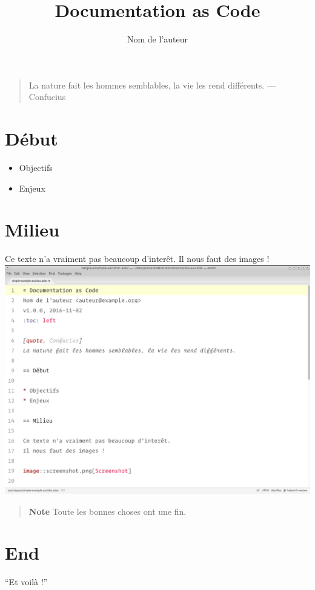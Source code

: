 \documentclass{article}
\begin{document}
\title{Documentation as Code}
\author{Nom de l'auteur}
\maketitle
\tableofcontents
\begin{quote}
	La nature fait les hommes semblables, la vie les rend différents.
	--- Confucius
\end{quote}
\section{Début}
  \begin{itemize}
  	\item{} Objectifs
  	\item{} Enjeux
  \end{itemize}
\section{Milieu}
Ce texte n'a vraiment pas beaucoup d'interêt.
Il nous faut des images !
\includegraphics{screenshot.png}
\begin{quote}
	\textbf{Note}
	Toute les bonnes choses ont une fin.
\end{quote}
\section{End}
\textquotedblleft{}Et voilà !\textquotedblright{}
\end{document}
